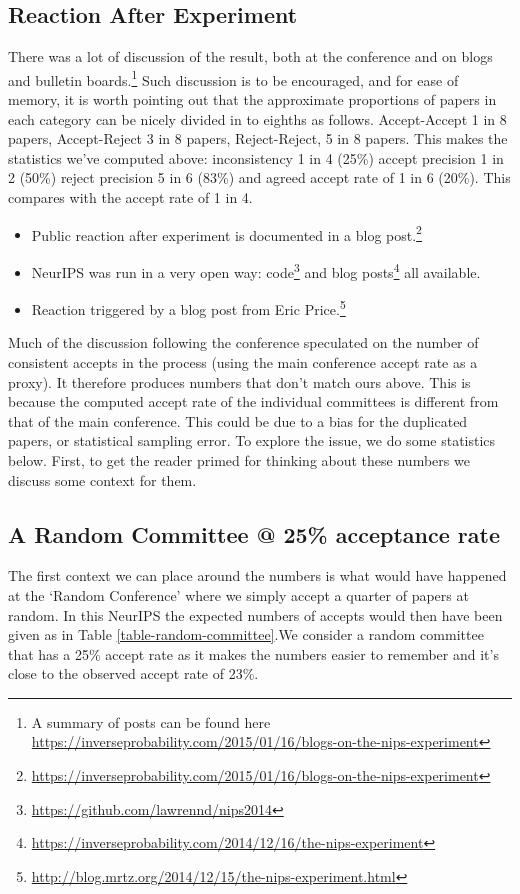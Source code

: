 \subsection{Reaction After Experiment}\label{reaction-after-experiment}

There was a lot of discussion of the result, both at the
conference and on blogs and bulletin boards.\footnote{A summary of posts can be found here \url{https://inverseprobability.com/2015/01/16/blogs-on-the-nips-experiment}} Such discussion is to be
encouraged, and for ease of memory, it is worth pointing out that the
approximate proportions of papers in each category can be nicely divided
in to eighths as follows. Accept-Accept 1 in 8 papers, Accept-Reject 3
in 8 papers, Reject-Reject, 5 in 8 papers. This makes the statistics
we've computed above: inconsistency 1 in 4 (25\%) accept precision 1 in
2 (50\%) reject precision 5 in 6 (83\%) and agreed accept rate of 1 in 6
(20\%). This compares with the accept rate of 1 in 4.

\begin{itemize}
\item
  Public reaction after experiment is documented in a blog post.\footnote{\url{https://inverseprobability.com/2015/01/16/blogs-on-the-nips-experiment}}

\item
  NeurIPS was run in a very open way:
  code\footnote{\url{https://github.com/lawrennd/nips2014}} and
  blog
  posts\footnote{\url{https://inverseprobability.com/2014/12/16/the-nips-experiment}} all available.
\item
  Reaction triggered by a blog post from Eric Price.\footnote{\url{http://blog.mrtz.org/2014/12/15/the-nips-experiment.html}}
\end{itemize}

Much of the discussion following the conference speculated on the number of consistent accepts in
the process (using the main conference accept rate as a proxy). It
therefore produces numbers that don't match ours above. This is because
the computed accept rate of the individual committees is different from
that of the main conference. This could be due to a bias for the
duplicated papers, or statistical sampling error. To explore the issue, we do some statistics below. First, to get the reader primed for thinking about
these numbers we discuss some context for them.


\subsection{A Random Committee @ 25\% acceptance rate}\label{a-random-committee-25}
The first context we can place around the numbers is what would have
happened at the `Random Conference' where we simply accept a quarter of
papers at random. In this NeurIPS the expected numbers of accepts would
then have been given as in Table \ref{table-random-committee}.We consider a random committee that has a 25\% accept rate as it makes the numbers easier to remember and it's close to the observed accept rate of 23\%.

